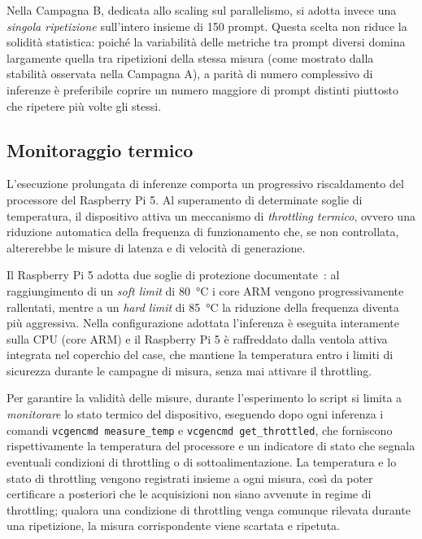 Nella Campagna B, dedicata allo scaling sul parallelismo, si adotta invece una
\emph{singola ripetizione} sull'intero insieme di 150 prompt. Questa scelta non
riduce la solidità statistica: poiché la variabilità delle metriche tra prompt
diversi domina largamente quella tra ripetizioni della stessa misura (come mostrato
dalla stabilità osservata nella Campagna A), a parità di numero complessivo di
inferenze è preferibile coprire un numero maggiore di prompt distinti piuttosto che
ripetere più volte gli stessi.

\subsection{Monitoraggio termico}

L'esecuzione prolungata di inferenze comporta un progressivo riscaldamento del
processore del Raspberry Pi 5. Al superamento di determinate soglie di
temperatura, il dispositivo attiva un meccanismo di \textit{throttling termico},
ovvero una riduzione automatica della frequenza di funzionamento che, se non
controllata, altererebbe le misure di latenza e di velocità di generazione.

Il Raspberry Pi 5 adotta due soglie di protezione documentate~\cite{raspberrypi_thermal}:
al raggiungimento di un \textit{soft limit} di 80~°C i core ARM vengono
progressivamente rallentati, mentre a un \textit{hard limit} di 85~°C la riduzione
della frequenza diventa più aggressiva. Nella configurazione adottata l'inferenza è
eseguita interamente sulla CPU (core ARM) e il Raspberry Pi 5 è raffreddato dalla
ventola attiva integrata nel coperchio del case, che mantiene la temperatura entro
i limiti di sicurezza durante le campagne di misura, senza mai attivare il throttling.

Per garantire la validità delle misure, durante l'esperimento lo script si limita a
\emph{monitorare} lo stato termico del dispositivo, eseguendo dopo ogni inferenza i
comandi \texttt{vcgencmd measure\_temp} e \texttt{vcgencmd get\_throttled}, che
forniscono rispettivamente la temperatura del processore e un indicatore di stato che
segnala eventuali condizioni di throttling o di sottoalimentazione. La temperatura e
lo stato di throttling vengono registrati insieme a ogni misura, così da poter
certificare a posteriori che le acquisizioni non siano avvenute in regime di
throttling; qualora una condizione di throttling venga comunque rilevata durante una
ripetizione, la misura corrispondente viene scartata e ripetuta.

